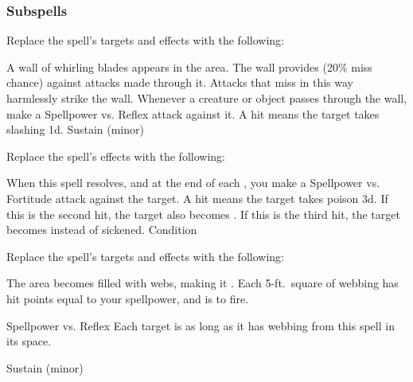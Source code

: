 \subsubsection{Subspells}
Replace the spell's targets and effects with the following:
\begin{spellcontent}
\begin{augmenttargetinginfo}
\end{augmenttargetinginfo}
\begin{augmenteffects}
\spelleffect
A wall of whirling blades appears in the area.
The wall provides  (20\% miss chance) against attacks made through it.
Attacks that miss in this way harmlessly strike the wall.
Whenever a creature or object passes through the wall, make a Spellpower vs. Reflex attack against it.
A hit means the target takes slashing  \minus1d.
\spelldur Sustain (minor)
\end{augmenteffects}
\end{spellcontent}
Replace the spell's effects with the following:
\begin{spellcontent}
\begin{augmenteffects}
\spelleffect
When this spell resolves, and at the end of each , you make a Spellpower vs. Fortitude attack against the target.
A hit means the target takes poison  \minus3d.
If this is the second hit, the target also becomes .
If this is the third hit, the target becomes  instead of sickened.
\spelldur Condition
\end{augmenteffects}
\end{spellcontent}
Replace the spell's targets and effects with the following:
\begin{spellcontent}
\begin{augmenttargetinginfo}
\end{augmenttargetinginfo}
\begin{augmenteffects}
\spelleffect
The area becomes filled with webs, making it .
Each 5-ft.\ square of webbing has hit points equal to your spellpower, and is  to fire.
\begin{spellattack}{Spellpower vs. Reflex}
\spellsuccess Each target is \immobilized as long as it has webbing from this spell in its space.
\end{spellattack}
\spelldur Sustain (minor)
\end{augmenteffects}
\end{spellcontent}
